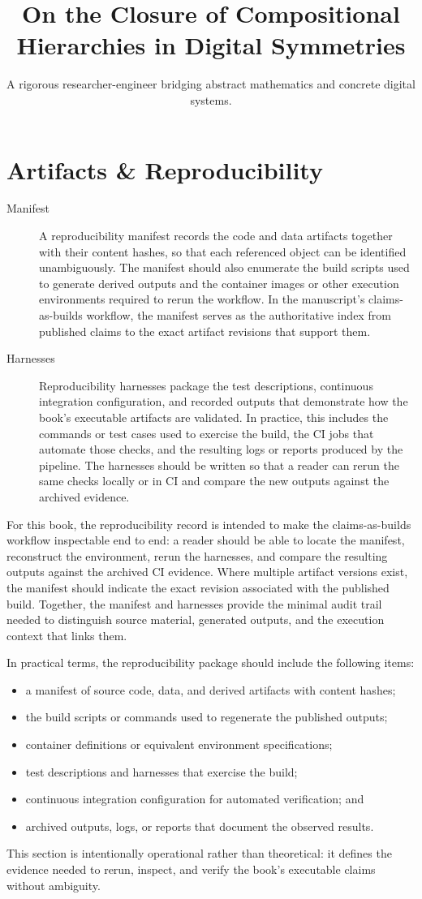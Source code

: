 \documentclass[11pt]{article}
\title{On the Closure of Compositional Hierarchies in Digital Symmetries}
\author{A rigorous researcher-engineer bridging abstract mathematics and concrete digital systems.}
\begin{document}
\section*{Artifacts \& Reproducibility}

\begin{description}
  \item[Manifest] A reproducibility manifest records the code and data artifacts together with their content hashes, so that each referenced object can be identified unambiguously. The manifest should also enumerate the build scripts used to generate derived outputs and the container images or other execution environments required to rerun the workflow. In the manuscript's claims-as-builds workflow, the manifest serves as the authoritative index from published claims to the exact artifact revisions that support them.

  \item[Harnesses] Reproducibility harnesses package the test descriptions, continuous integration configuration, and recorded outputs that demonstrate how the book's executable artifacts are validated. In practice, this includes the commands or test cases used to exercise the build, the CI jobs that automate those checks, and the resulting logs or reports produced by the pipeline. The harnesses should be written so that a reader can rerun the same checks locally or in CI and compare the new outputs against the archived evidence.
\end{description}

For this book, the reproducibility record is intended to make the claims-as-builds workflow inspectable end to end: a reader should be able to locate the manifest, reconstruct the environment, rerun the harnesses, and compare the resulting outputs against the archived CI evidence. Where multiple artifact versions exist, the manifest should indicate the exact revision associated with the published build. Together, the manifest and harnesses provide the minimal audit trail needed to distinguish source material, generated outputs, and the execution context that links them.

In practical terms, the reproducibility package should include the following items:
\begin{itemize}
  \item a manifest of source code, data, and derived artifacts with content hashes;
  \item the build scripts or commands used to regenerate the published outputs;
  \item container definitions or equivalent environment specifications;
  \item test descriptions and harnesses that exercise the build;
  \item continuous integration configuration for automated verification; and
  \item archived outputs, logs, or reports that document the observed results.
\end{itemize}

This section is intentionally operational rather than theoretical: it defines the evidence needed to rerun, inspect, and verify the book's executable claims without ambiguity.
\end{document}

